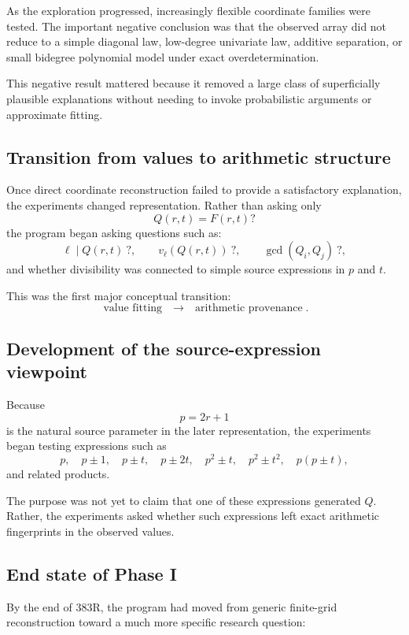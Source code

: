 \documentclass[11pt,a4paper]{article}
\begin{document}
As the exploration progressed, increasingly flexible coordinate families were tested. The important negative conclusion was that the observed array did not reduce to a simple diagonal law, low-degree univariate law, additive separation, or small bidegree polynomial model under exact overdetermination.

This negative result mattered because it removed a large class of superficially plausible explanations without needing to invoke probabilistic arguments or approximate fitting.

\subsection{Transition from values to arithmetic structure}

Once direct coordinate reconstruction failed to provide a satisfactory explanation, the experiments changed representation. Rather than asking only
\[
Q(r,t)=F(r,t)?
\]
the program began asking questions such as:
\[
\ell\mid Q(r,t)\ ?,
\qquad
v_\ell(Q(r,t))\ ?,
\qquad
\gcd(Q_i,Q_j)\ ?,
\]
and whether divisibility was connected to simple source expressions in $p$ and $t$.

This was the first major conceptual transition:
\[
\boxed{
\text{value fitting}
\quad\longrightarrow\quad
\text{arithmetic provenance}
}.
\]

\subsection{Development of the source-expression viewpoint}

Because
\[
p=2r+1
\]
is the natural source parameter in the later representation, the experiments began testing expressions such as
\[
p,\quad p\pm1,\quad p\pm t,\quad p\pm2t,\quad
p^2\pm t,\quad p^2\pm t^2,\quad p(p\pm t),
\]
and related products.

The purpose was not yet to claim that one of these expressions generated $Q$. Rather, the experiments asked whether such expressions left exact arithmetic fingerprints in the observed values.

\subsection{End state of Phase I}

By the end of 383R, the program had moved from generic finite-grid reconstruction toward a much more specific research question:
\end{document}

